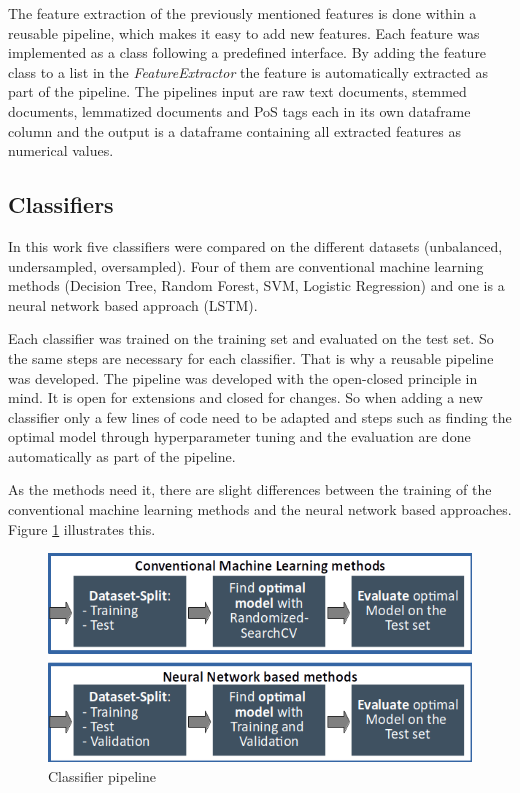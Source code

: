 The feature extraction of the previously mentioned features is done within a reusable pipeline, which makes it easy to add new features. Each feature was implemented as a class following a predefined interface. By adding the feature class to a list in the \textit{Feature\-Extractor} the feature is automatically extracted as part of the pipeline. The pipelines input are raw text documents, stemmed documents, lemmatized documents and PoS tags each in its own dataframe column and the output is a dataframe containing all extracted features as numerical values.

\subsection{Classifiers}
\label{ch:approachD}

In this work five classifiers were compared on the different datasets (unbalanced, undersampled, oversampled). Four of them are conventional machine learning methods (Decision Tree, Random Forest, SVM, Logistic Regression) and one is a neural network based approach (LSTM).

Each classifier was trained on the training set and evaluated on the test set. So the same steps are necessary for each classifier. That is why a reusable pipeline was developed. The pipeline was developed with the open-closed principle in mind. It is open for extensions and closed for changes. So when adding a new classifier only a few lines of code need to be adapted and steps such as finding the optimal model through hyperparameter tuning and the evaluation are done automatically as part of the pipeline.

As the methods need it, there are slight differences between the training of the conventional machine learning methods and the neural network based approaches. Figure \ref{fig:classifier_pipeline} illustrates this.

\begin{figure}[ht]
	\centering
	\includegraphics[width=0.7\linewidth]{figures/classifier_pipeline.png}
	\caption{Classifier pipeline}
	\label{fig:classifier_pipeline}
\end{figure}

